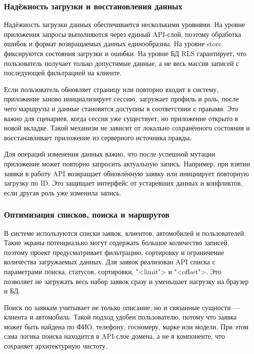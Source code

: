 \subsubsection{Надёжность загрузки и восстановления данных}

Надёжность загрузки данных обеспечивается несколькими уровнями. На уровне приложения запросы выполняются через единый API-слой, поэтому обработка ошибок и формат возвращаемых данных единообразны. На уровне store фиксируются состояния загрузки и ошибки. На уровне БД RLS гарантирует, что пользователь получает только допустимые данные, а не весь массив записей с последующей фильтрацией на клиенте.

Если пользователь обновляет страницу или повторно входит в систему, приложение заново инициализирует сессию, загружает профиль и роль, после чего маршруты и данные становятся доступны в соответствии с правами. Это важно для сценариев, когда сессия уже существует, но приложение открыто в новой вкладке. Такой механизм не зависит от локально сохранённого состояния и восстанавливает приложение из серверного источника правды.

Для операций изменения данных важно, что после успешной мутации приложение может повторно запросить актуальную запись. Например, при взятии заявки в работу API возвращает обновлённую заявку или инициирует повторную загрузку по ID. Это защищает интерфейс от устаревших данных и конфликтов, если другая роль уже изменила запись.

\subsubsection{Оптимизация списков, поиска и маршрутов}

В системе используются списки заявок, клиентов, автомобилей и пользователей. Такие экраны потенциально могут содержать большое количество записей, поэтому проект предусматривает фильтрацию, сортировку и ограничение количества загружаемых данных. Для заявок реализован API списка с параметрами поиска, статусов, сортировки, "<limit"> и "<offset">. Это позволяет не загружать весь набор заявок сразу и уменьшает нагрузку на браузер и БД.

Поиск по заявкам учитывает не только описание, но и связанные сущности — клиента и автомобиль. Такой подход удобен пользователю, потому что заявка может быть найдена по ФИО, телефону, госномеру, марке или модели. При этом сама логика поиска находится в API-слое домена, а не в компоненте, что сохраняет архитектурную чистоту.

